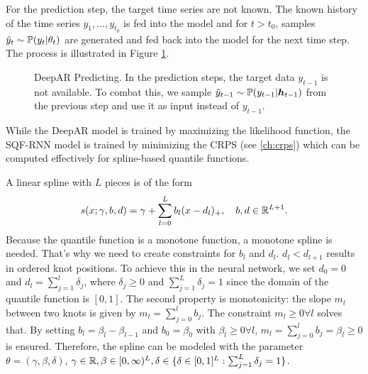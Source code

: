 For the prediction step, the target time series are not known. 
The known history of the time series \(y_1, \ldots, y_{t_0}\) is fed into the 
model and for \(t > t_0\), samples \(\tilde{y}_t \sim \P(y_t | \theta_t)\) 
are generated and fed back into the model for the next time step.
The process is illustrated in Figure \ref{fig:deepar-predicting}.

\begin{figure}[h]%
    \centering
    
    \caption[DeepAR Predicting]{DeepAR Predicting. 
    In the prediction steps, the target data \(y_{t-1}\) is not available. 
    To combat this, we sample \(\tilde{y}_{t-1} \sim \P(y_{t-1} | \boldsymbol{h}_{t-1})\) 
    from the previous step and use it as input instead of \(y_{t-1}\).}%
    \label{fig:deepar-predicting}%
\end{figure}

While the DeepAR model is trained by maximizing the likelihood function, 
the SQF-RNN model is trained by minimizing the CRPS (see \ref{ch:crps}) 
which can be computed effectively for spline-based quantile functions.

A linear spline with \(L\) pieces is of the form 
\[ s(x; \gamma, b, d) = \gamma + \sum_{l=0}^L b_l (x - d_l)_+, 
\quad b, d \in \R^{L+1}. \]
Because the quantile function is a monotone function, 
a monotone spline is needed. That's why we need to create constraints 
for \(b_l\) and \(d_l\).
\(d_l < d_{l+1}\) results in ordered knot positions. To achieve this 
in the neural network, we set \(d_0 = 0\) and \(d_l = \sum_{j=1}^l \delta_j\), 
where \(\delta_j \geq 0\) and \(\sum_{j=1}^L \delta_j = 1\) since the domain 
of the quantile function is \([0, 1]\). 
The second property is monotonicity: the slope \(m_l\) between two knots is given by 
\(m_l = \sum_{j=0}^l b_j\). The constraint \(m_l \geq 0 \forall l\) solves that.
By setting \(b_l = \beta_l - \beta_{l-1}\) and \(b_0 = \beta_0\) with \(\beta_l \geq 0 \forall l\), 
\(m_l = \sum_{j=0}^l b_j = \beta_l \geq 0\) is ensured.
Therefore, the spline can be modeled with the parameter 
\(\theta = (\gamma, \beta, \delta)\), \(\gamma \in \R, \beta \in [0,\infty)^{L}, 
\delta \in \set{ \delta \in [0,1]^L: \sum_{j=1}^L \delta_j = 1 }\).